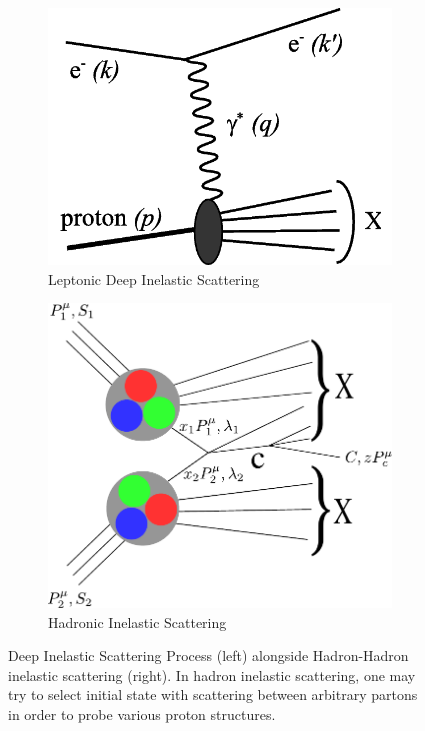 \begin{figure}[ht]
  \centering
	\begin{subfigure}{0.5\textwidth}
		\centering
		\includegraphics[width=\textwidth]{./figures/deep_inelastic_basic.png}
    \caption{Leptonic Deep Inelastic Scattering}
		\label{fig:dis}
	\end{subfigure}%
	\begin{subfigure}{0.5\textwidth}
		\centering
		\includegraphics[width=\textwidth]{./figures/hadron_inlastic_scattering.pdf}
    \caption{Hadronic Inelastic Scattering}
    \label{fig:his}
	\end{subfigure}
  \caption{
    Deep Inelastic Scattering Process (left) alongside Hadron-Hadron inelastic
    scattering (right). In hadron inelastic scattering, one may try to select
    initial state with scattering between arbitrary partons in order to probe
    various proton structures.
  }
  \label{fig:hadron_inelastic_scattering}
\end{figure}

